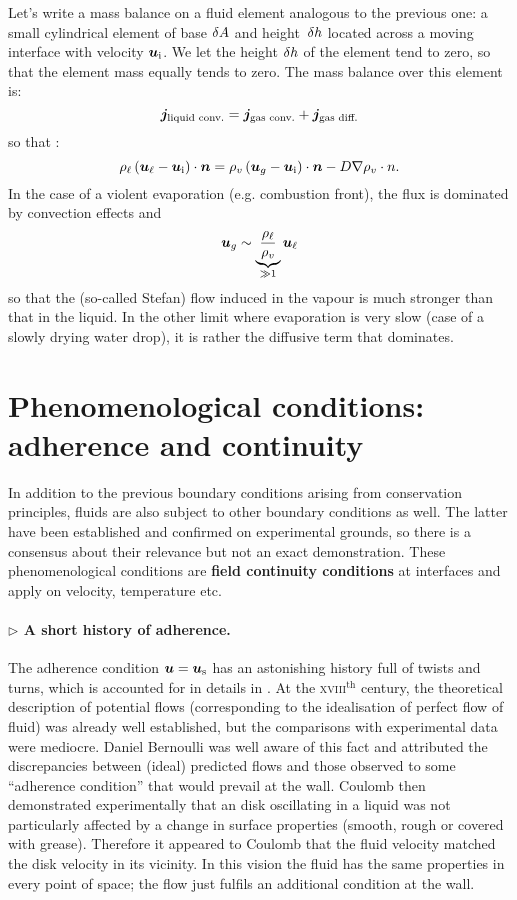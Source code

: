 Let's write a mass balance on a fluid element analogous to the previous one: a small cylindrical element of base $\delta A$ and height~$\delta h$ located across a moving interface with velocity $\bu_\text i$. We let the height $\delta h$ of the element tend to zero, so that the element mass equally tends to zero. The mass balance over this element is:
\begin{equation}
\bj_\text{liquid conv.} = \bj_\text{gas conv.} + \bj_\text{gas diff.}
\end{equation}
so that :
\begin{equation}
\rho_\ell \lp\bu_\ell - \bu_\text i\rp \cdot \bn = \rho_v \lp\bu_g -\bu_\text i\rp\cdot \bn - D \nabla \rho_v \cdot n.
\end{equation}
In the case of a violent evaporation (e.g. combustion front), the flux is dominated by convection effects and 
$$\bu_g \sim \underbrace{\frac{\rho_\ell}{\rho_v}}_{\gg 1} \bu_\ell$$
so that the (so-called Stefan) flow induced in the vapour is much stronger than that in the liquid.
In the other limit where evaporation is very slow (case of a slowly drying water drop), it is rather the diffusive term that dominates.
\section{Phenomenological conditions: adherence and continuity}
In addition to the previous boundary conditions arising from conservation principles, fluids are also subject to other boundary conditions as well. The latter have been established and confirmed on experimental grounds, so there is a consensus about their relevance but not an exact demonstration. These phenomenological conditions are \textbf{field continuity conditions} at interfaces and apply on velocity, temperature etc.

\paragraph{$\rhd$ A short history of adherence.} The adherence condition $\bu = \bu_\mathrm{s}$ has an astonishing history full of twists and turns, which is accounted for in details in \citet{Goldstein1950}. At the \textsc{xviii}$^\text{th}$ century, the theoretical description of potential flows (corresponding to the idealisation of perfect flow of fluid) was already well established, but the comparisons with experimental data were mediocre. Daniel Bernoulli was well aware of this fact and attributed the discrepancies between (ideal) predicted flows and those observed to some ``adherence condition'' that would prevail at the wall. Coulomb then demonstrated experimentally that an disk oscillating in a liquid was not particularly affected by a change in surface properties (smooth, rough or covered with grease). Therefore it appeared to Coulomb that the fluid velocity matched the disk velocity in its vicinity. In this vision the fluid has the same properties in every point of space; the flow just fulfils an additional condition at the wall.

